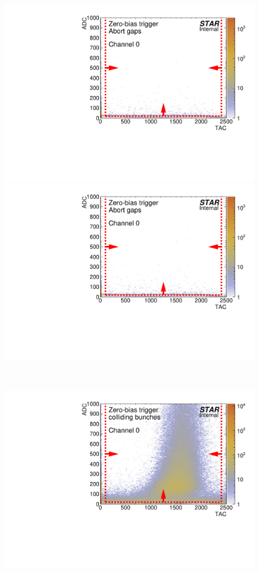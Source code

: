 \begin{figure}[t]\ContinuedFloat
\centering\vspace{-30.5em}
\parbox{0.495\textwidth}{
  \centering
  \includegraphics[width=\linewidth,page=47]{graphics/eventSelection/bbc/Bbc_ADCvsTAC_abortGaps.pdf}\\
  \includegraphics[width=\linewidth,page=48]{graphics/eventSelection/bbc/Bbc_ADCvsTAC_abortGaps.pdf}
}~
\parbox{0.495\textwidth}{
  \centering
  \includegraphics[width=\linewidth,page=47]{graphics/eventSelection/bbc/Bbc_ADCvsTAC_collidingBunches.pdf}\\
}
\end{figure}
